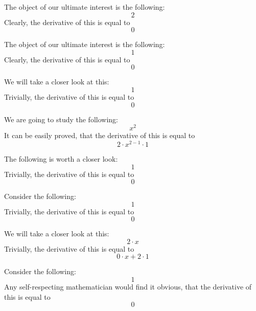 \documentclass{article}
\begin{document}
The object of our ultimate interest is the following:
\begin{equation}
2 
\end{equation}
Clearly, the derivative of this is equal to
\begin{equation}
0 
\end{equation}

The object of our ultimate interest is the following:
\begin{equation}
1 
\end{equation}
Clearly, the derivative of this is equal to
\begin{equation}
0 
\end{equation}

We will take a closer look at this:
\begin{equation}
1 
\end{equation}
Trivially, the derivative of this is equal to
\begin{equation}
0 
\end{equation}

We are going to study the following:
\begin{equation}
x ^{2 } 
\end{equation}
It can be easily proved, that the derivative of this is equal to
\begin{equation}
2 \cdot x ^{2 - 1 } \cdot 1 
\end{equation}

The following is worth a closer look:
\begin{equation}
1 
\end{equation}
Trivially, the derivative of this is equal to
\begin{equation}
0 
\end{equation}

Consider the following:
\begin{equation}
1 
\end{equation}
Trivially, the derivative of this is equal to
\begin{equation}
0 
\end{equation}

We will take a closer look at this:
\begin{equation}
2 \cdot x 
\end{equation}
Trivially, the derivative of this is equal to
\begin{equation}
0 \cdot x + 2 \cdot 1 
\end{equation}

Consider the following:
\begin{equation}
1 
\end{equation}
Any self-respecting mathematician would find it obvious, that the derivative of this is equal to
\begin{equation}
0 
\end{equation}
\end{document}
